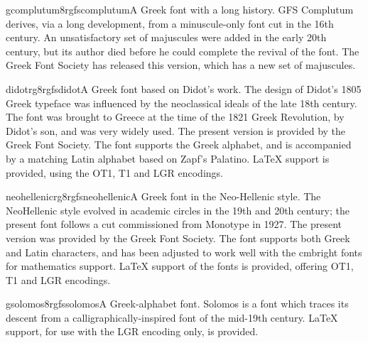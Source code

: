 \documentclass{ddltxtyp}
\begin{document}

\begin{package}{gcomplutum8r}{gfscomplutum}{A Greek font with a long history.}
GFS Complutum derives, via a long development, from a
minuscule-only font cut in the 16th century. An unsatisfactory
set of majuscules were added in the early 20th century, but its
author died before he could complete the revival of the font.
The Greek Font Society has released this version, which has a
new set of majuscules.
\end{package}

\begin{package}{didotrg8r}{gfsdidot}{A Greek font based on Didot's work.}
The design of Didot's 1805 Greek typeface was influenced by the
neoclassical ideals of the late 18th century. The font was
brought to Greece at the time of the 1821 Greek Revolution, by
Didot's son, and was very widely used. The present version is
provided by the Greek Font Society. The font supports the Greek
alphabet, and is accompanied by a matching Latin alphabet based
on Zapf's Palatino. {\LaTeX} support is provided, using the OT1,
T1 and LGR encodings.
\end{package}

\begin{package}{neohellenicrg8r}{gfsneohellenic}{A Greek font in the Neo-Hellenic style.}
The NeoHellenic style evolved in academic circles in the 19th
and 20th century; the present font follows a cut commissioned
from Monotype in 1927. The present version was provided by the
Greek Font Society. The font supports both Greek and Latin
characters, and has been adjusted to work well with the
cmbright fonts for mathematics support. {\LaTeX} support of the
fonts is provided, offering OT1, T1 and LGR encodings.
\end{package}
\begin{package}{gsolomos8r}{gfssolomos}{A Greek-alphabet font.}
Solomos is a font which traces its descent from a
calligraphically-inspired font of the mid-19th century. {\LaTeX}
support, for use with the LGR encoding only, is provided.
\end{package}
\end{document}
